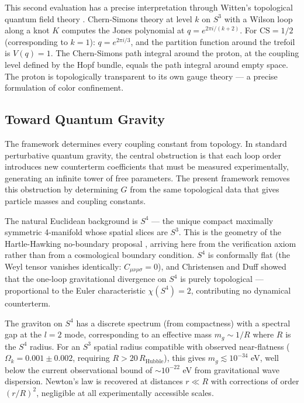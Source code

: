This second evaluation has a precise interpretation through Witten's topological quantum field theory \cite{witten1989}. Chern-Simons theory at level $k$ on $S^3$ with a Wilson loop along a knot $K$ computes the Jones polynomial at $q = e^{2\pi i/(k+2)}$. For $\mathrm{CS} = 1/2$ (corresponding to $k = 1$): $q = e^{2\pi i/3}$, and the partition function around the trefoil is $V(q) = 1$. The Chern-Simons path integral around the proton, at the coupling level defined by the Hopf bundle, equals the path integral around empty space. The proton is topologically transparent to its own gauge theory --- a precise formulation of color confinement.



\subsection{Toward Quantum Gravity}

The framework determines every coupling constant from topology. In standard perturbative quantum gravity, the central obstruction is that each loop order introduces new counterterm coefficients that must be measured experimentally, generating an infinite tower of free parameters. The present framework removes this obstruction by determining $G$ from the same topological data that gives particle masses and coupling constants.

The natural Euclidean background is $S^4$ --- the unique compact maximally symmetric 4-manifold whose spatial slices are $S^3$. This is the geometry of the Hartle-Hawking no-boundary proposal \cite{hartlehawking1983}, arriving here from the verification axiom rather than from a cosmological boundary condition. $S^4$ is conformally flat (the Weyl tensor vanishes identically: $C_{\mu\nu\rho\sigma} = 0$), and Christensen and Duff \cite{christensenduff1979} showed that the one-loop gravitational divergence on $S^4$ is purely topological --- proportional to the Euler characteristic $\chi(S^4) = 2$, contributing no dynamical counterterm.

The graviton on $S^4$ has a discrete spectrum (from compactness) with a spectral gap at the $l = 2$ mode, corresponding to an effective mass $m_g \sim 1/R$ where $R$ is the $S^4$ radius. For an $S^3$ spatial radius compatible with observed near-flatness ($\Omega_k = 0.001 \pm 0.002$, requiring $R > 20 \, R_{\text{Hubble}}$), this gives $m_g \lesssim 10^{-34}$ eV, well below the current observational bound of $\sim 10^{-22}$ eV from gravitational wave dispersion. Newton's law is recovered at distances $r \ll R$ with corrections of order $(r/R)^2$, negligible at all experimentally accessible scales.

